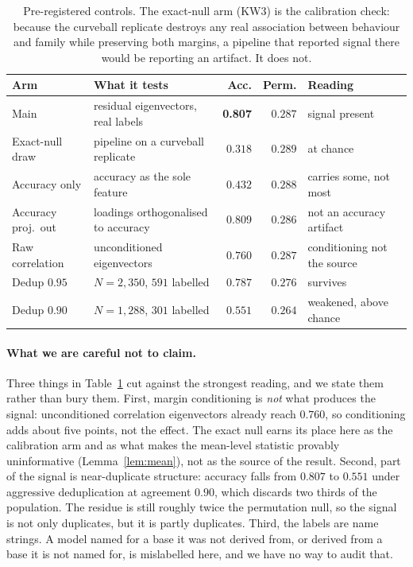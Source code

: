 \documentclass{article}
\begin{document}
\begin{table}[t]
\centering
\small
\begin{tabular}{llrrl}
\toprule
Arm & What it tests & Acc. & Perm. & Reading \\
\midrule
Main & residual eigenvectors, real labels & \textbf{0.807} & $0.287$ & signal present \\
Exact-null draw & pipeline on a curveball replicate & $0.318$ & $0.289$ & at chance \\
Accuracy only & accuracy as the sole feature & $0.432$ & $0.288$ & carries some, not most \\
Accuracy proj.\ out & loadings orthogonalised to accuracy & $0.809$ & $0.286$ & not an accuracy artifact \\
Raw correlation & unconditioned eigenvectors & $0.760$ & $0.287$ & conditioning not the source \\
Dedup $0.95$ & $N=2{,}350$, $591$ labelled & $0.787$ & $0.276$ & survives \\
Dedup $0.90$ & $N=1{,}288$, $301$ labelled & $0.551$ & $0.264$ & weakened, above chance \\
\bottomrule
\end{tabular}
\caption{Pre-registered controls. The exact-null arm (KW3) is the calibration check: because the
curveball replicate destroys any real association between behaviour and family while preserving
both margins, a pipeline that reported signal there would be reporting an artifact. It does not.}
\label{tab:controls}
\end{table}

\paragraph{What we are careful not to claim.} Three things in Table~\ref{tab:controls} cut against
the strongest reading, and we state them rather than bury them. First, margin conditioning is
\emph{not} what produces the signal: unconditioned correlation eigenvectors already reach $0.760$,
so conditioning adds about five points, not the effect. The exact null earns its place here as the
calibration arm and as what makes the mean-level statistic provably uninformative
(Lemma~\ref{lem:mean}), not as the source of the result. Second, part of the signal is
near-duplicate structure: accuracy falls from $0.807$ to $0.551$ under aggressive deduplication at
agreement $0.90$, which discards two thirds of the population. The residue is still roughly twice
the permutation null, so the signal is not only duplicates, but it is partly duplicates. Third, the
labels are name strings. A model named for a base it was not derived from, or derived from a base it
is not named for, is mislabelled here, and we have no way to audit that.
\end{document}
